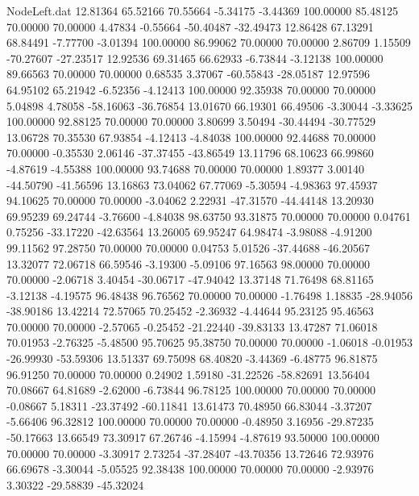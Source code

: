 \begin{filecontents}{NodeLeft.dat}
  12.81364   65.52166   70.55664    -5.34175   -3.44369  100.00000   85.48125   70.00000   70.00000    4.47834   -0.55664  -50.40487  -32.49473
  12.86428   67.13291   68.84491    -7.77700   -3.01394  100.00000   86.99062   70.00000   70.00000    2.86709    1.15509  -70.27607  -27.23517
  12.92536   69.31465   66.62933    -6.73844   -3.12138  100.00000   89.66563   70.00000   70.00000    0.68535    3.37067  -60.55843  -28.05187
  12.97596   64.95102   65.21942    -6.52356   -4.12413  100.00000   92.35938   70.00000   70.00000    5.04898    4.78058  -58.16063  -36.76854
  13.01670   66.19301   66.49506    -3.30044   -3.33625  100.00000   92.88125   70.00000   70.00000    3.80699    3.50494  -30.44494  -30.77529
  13.06728   70.35530   67.93854    -4.12413   -4.84038  100.00000   92.44688   70.00000   70.00000   -0.35530    2.06146  -37.37455  -43.86549
  13.11796   68.10623   66.99860    -4.87619   -4.55388  100.00000   93.74688   70.00000   70.00000    1.89377    3.00140  -44.50790  -41.56596
  13.16863   73.04062   67.77069    -5.30594   -4.98363   97.45937   94.10625   70.00000   70.00000   -3.04062    2.22931  -47.31570  -44.44148
  13.20930   69.95239   69.24744    -3.76600   -4.84038   98.63750   93.31875   70.00000   70.00000    0.04761    0.75256  -33.17220  -42.63564
  13.26005   69.95247   64.98474    -3.98088   -4.91200   99.11562   97.28750   70.00000   70.00000    0.04753    5.01526  -37.44688  -46.20567
  13.32077   72.06718   66.59546    -3.19300   -5.09106   97.16563   98.00000   70.00000   70.00000   -2.06718    3.40454  -30.06717  -47.94042
  13.37148   71.76498   68.81165    -3.12138   -4.19575   96.48438   96.76562   70.00000   70.00000   -1.76498    1.18835  -28.94056  -38.90186
  13.42214   72.57065   70.25452    -2.36932   -4.44644   95.23125   95.46563   70.00000   70.00000   -2.57065   -0.25452  -21.22440  -39.83133
  13.47287   71.06018   70.01953    -2.76325   -5.48500   95.70625   95.38750   70.00000   70.00000   -1.06018   -0.01953  -26.99930  -53.59306
  13.51337   69.75098   68.40820    -3.44369   -6.48775   96.81875   96.91250   70.00000   70.00000    0.24902    1.59180  -31.22526  -58.82691
  13.56404   70.08667   64.81689    -2.62000   -6.73844   96.78125  100.00000   70.00000   70.00000   -0.08667    5.18311  -23.37492  -60.11841
  13.61473   70.48950   66.83044    -3.37207   -5.66406   96.32812  100.00000   70.00000   70.00000   -0.48950    3.16956  -29.87235  -50.17663
  13.66549   73.30917   67.26746    -4.15994   -4.87619   93.50000  100.00000   70.00000   70.00000   -3.30917    2.73254  -37.28407  -43.70356
  13.72646   72.93976   66.69678    -3.30044   -5.05525   92.38438  100.00000   70.00000   70.00000   -2.93976    3.30322  -29.58839  -45.32024

\end{filecontents}

